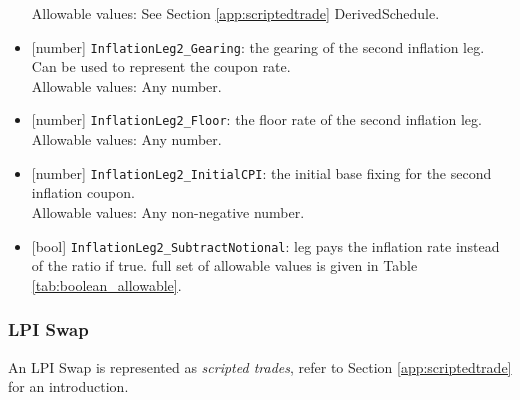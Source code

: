 \begin{itemize}
  Allowable values: See Section \ref{app:scriptedtrade} DerivedSchedule.
  \item{}[number] \lstinline!InflationLeg2_Gearing!:  the gearing of the second inflation leg. Can be used to represent the coupon rate. \\
  Allowable values: Any number.
  \item{}[number] \lstinline!InflationLeg2_Floor!:  the floor rate of the second inflation leg. \\
  Allowable values: Any number.
  \item{}[number] \lstinline!InflationLeg2_InitialCPI!: the initial base fixing for the second inflation coupon. \\
  Allowable values: Any non-negative number.
  \item{}[bool] \lstinline!InflationLeg2_SubtractNotional!: leg pays the inflation rate instead of the ratio if true.
  full set of allowable values is given in Table \ref{tab:boolean_allowable}.
\end{itemize}

\subsubsection{LPI Swap}


An LPI Swap is represented as {\em scripted trades}, refer to Section
\ref{app:scriptedtrade} for an introduction.

